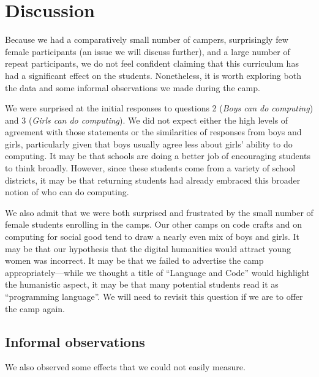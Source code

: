 
\section{Discussion}

Because we had a comparatively small number of campers, surprisingly
few female participants (an issue we will discuss further), and a
large number of repeat participants, we do not feel confident
claiming that this curriculum has had a significant effect on the
students.  Nonetheless, it is worth exploring both the data and
some informal observations we made during the camp.

We were surprised at the initial responses to questions 2 (\textit{Boys
can do computing}) and 3 (\textit{Girls can do computing}).  We did
not expect either the high levels of agreement with those statements
or the similarities of responses from boys and girls, particularly
given that boys usually agree less about girls' ability to do
computing.  It may be that schools are doing a better job of
encouraging students to think broadly.  However, since these students
come from a variety of school districts, it may be that returning
students had already embraced this broader notion of who can do
computing.

We also admit that we were both surprised and frustrated by the
small number of female students enrolling in the camps.  Our other
camps on code crafts and on computing for social good tend to draw
a nearly even mix of boys and girls.  It may be that our hypothesis
that the digital humanities would attract young women was incorrect.
It may be that we failed to advertise the camp appropriately---while
we thought a title of ``Language and Code'' would highlight the
humanistic aspect, it may be that many potential students read it
as ``programming language''.  We will need to revisit this question
if we are to offer the camp again.

\subsection{Informal observations}

We also observed some effects that we could not easily measure.

